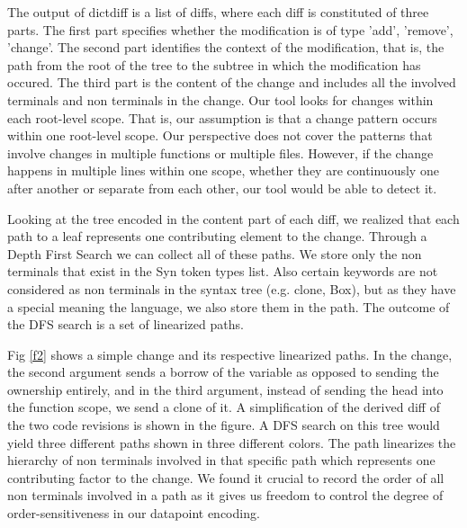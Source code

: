The output of dictdiff is a list of diffs, where each diff is constituted of three parts. The first part specifies whether the modification is of type 'add', 'remove', 'change'. The second part identifies the context of the modification, that is, the path from the root of the tree to the subtree in which the modification has occured. The third part is the content of the change and includes all the involved terminals and non terminals in the change. Our tool looks for changes within each root-level scope. That is, our assumption is that a change pattern occurs within one root-level scope. Our perspective does not cover the patterns that involve changes in multiple functions or multiple files. However, if the change happens in multiple lines within one scope, whether they are continuously one after another or separate from each other, our tool would be able to detect it.

Looking at the tree encoded in the content part of each diff, we realized that each path to a leaf represents one contributing element to the change. Through a Depth First Search we can collect all of these paths. We store only the non terminals that exist in the Syn token types list. Also certain keywords are not considered as non terminals in the syntax tree (e.g. clone, Box), but as they have a special meaning the language, we also store them in the path. The outcome of the DFS search is a set of linearized paths.

Fig \ref{f2} shows a simple change and its respective linearized paths. In the change, the second argument sends a borrow of the variable as opposed to sending the ownership entirely, and in the third argument, instead of sending the head into the function scope, we send a clone of it. A simplification of the derived diff of the two code revisions is shown in the figure. A DFS search on this tree would yield three different paths shown in three different colors. The path linearizes the hierarchy of non terminals involved in that specific path which represents one contributing factor to the change. We found it crucial to record the order of all non terminals involved in a path as it gives us freedom to control the degree of order-sensitiveness in our datapoint encoding.

